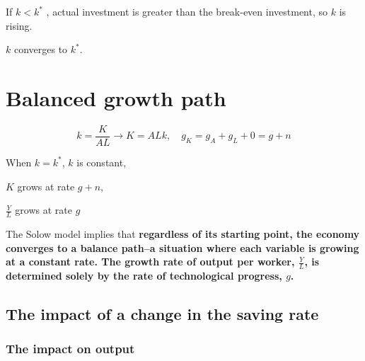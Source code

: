 \documentclass[12pt]{article}
\begin{document}
\begin{figure}[H]
\end{figure}

If $ k < k ^{*} $ , actual investment is greater than the break-even investment, so
$ k $ is rising.

$ k $ converges to $ k ^{*} $.


\section{Balanced growth path}

\begin{equation*}
k = \frac{K}{AL} \rightarrow K = ALk, \quad g_{K} = g_{A} + g_{L} + 0 = g + n
\end{equation*}

When $ k = k ^{*} $, $ k $ is constant,

$ K $ grows at rate $ g + n $,

$ \frac{Y}{L} $ grows at rate $ g $

The Solow model implies that {\textbf {regardless of its starting point, the economy
converges to a balance path--a situation where each variable is growing at a constant
rate. The growth rate of output per worker, $ \frac{Y}{L} $, is determined solely
by the rate of technological progress, $ g $.}}


\subsection{The impact of a change in the saving rate}
\subsubsection{The impact on output}
\end{document}
